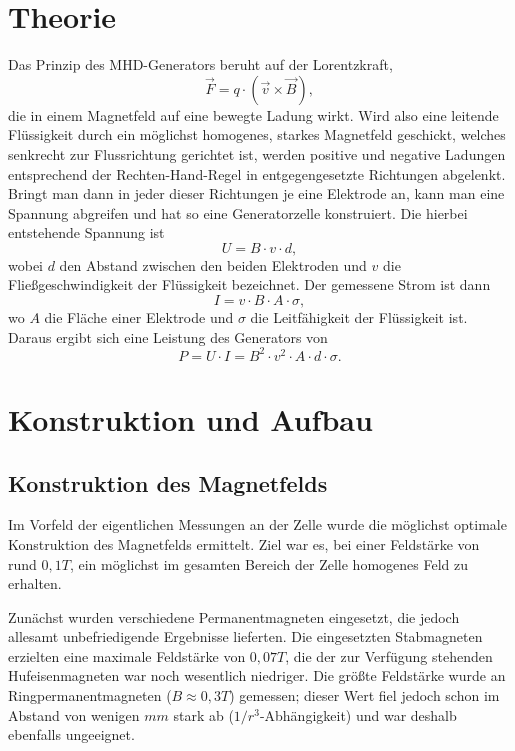 \documentclass[11pt]{scrartcl}
\begin{document}
\section{Theorie}	%


Das Prinzip des MHD-Generators beruht auf der Lorentzkraft,
\begin{equation}
\vec{F} = q \cdot \left(\vec{v} \times \vec{B} \right),
\end{equation}
die in einem Magnetfeld auf eine bewegte Ladung wirkt. Wird also eine leitende Fl\"ussigkeit durch ein m\"oglichst homogenes, starkes Magnetfeld geschickt, welches senkrecht zur Flussrichtung gerichtet ist, werden positive und negative Ladungen entsprechend der Rechten-Hand-Regel in entgegengesetzte Richtungen abgelenkt. Bringt man dann in jeder dieser Richtungen je eine Elektrode an, kann man eine Spannung abgreifen und hat so eine Generatorzelle konstruiert. Die hierbei entstehende Spannung ist
\begin{equation}
U = B \cdot v \cdot d,
\end{equation}
wobei $d$ den Abstand zwischen den beiden Elektroden und $v$ die Flie\ss{}geschwindigkeit der Fl\"ussigkeit bezeichnet. Der gemessene Strom ist dann 
\begin{equation}
I = v \cdot B \cdot A \cdot \sigma,
\end{equation}
wo $A$ die Fl\"ache einer Elektrode und $\sigma$ die Leitf\"ahigkeit der Fl\"ussigkeit ist. Daraus ergibt sich eine Leistung des Generators von
\begin{equation}
P = U \cdot I = B^{2} \cdot v^{2} \cdot A \cdot d \cdot \sigma.
\end{equation}


\section{Konstruktion und Aufbau}

\subsection{Konstruktion des Magnetfelds}		%
Im Vorfeld der eigentlichen Messungen an der Zelle wurde die möglichst optimale Konstruktion des Magnetfelds ermittelt. Ziel war es, bei einer Feldstärke von rund $0,1 T$, ein möglichst im gesamten Bereich der Zelle homogenes Feld zu erhalten.

Zunächst wurden verschiedene Permanentmagneten eingesetzt, die jedoch allesamt unbefriedigende Ergebnisse lieferten. Die eingesetzten Stabmagneten erzielten eine maximale Feldstärke von $0,07T$, die der zur Verfügung stehenden Hufeisenmagneten war noch wesentlich niedriger. Die größte Feldstärke wurde an Ringpermanentmagneten ($B\approx0,3T$) gemessen; dieser Wert fiel jedoch schon im Abstand von wenigen $mm$ stark ab ($1/r^3$-Abhängigkeit) und war deshalb ebenfalls ungeeignet.
\end{document}
